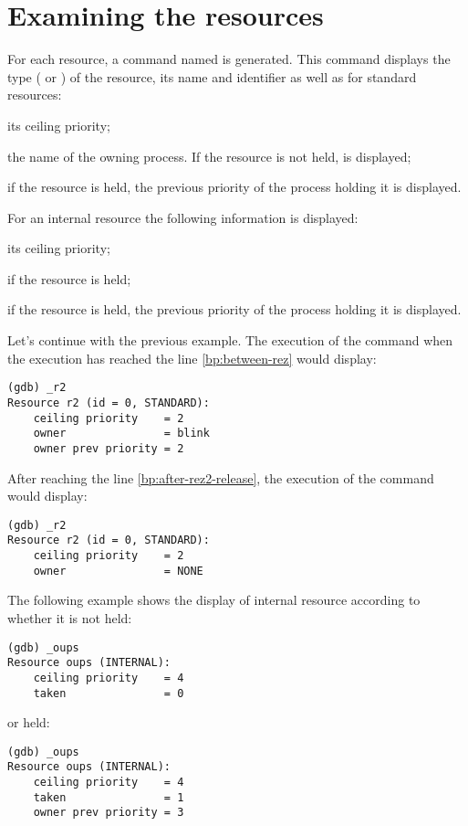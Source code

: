\section{Examining the resources}

For each resource, a command named  is generated. This command displays the type ( or ) of the resource, its name and identifier as well as for standard resources:

\begin{pitemize}
\item its ceiling priority;
\item the name of the owning process. If the resource is not held,  is displayed;
\item if the resource is held, the previous priority of the process holding it is displayed.
\end{pitemize}

For an internal resource the following information is displayed:

\begin{pitemize}
\item its ceiling priority;
\item if the resource is held;
\item if the resource is held, the previous priority of the process holding it is displayed.
\end{pitemize}

Let's continue with the previous example. The execution of the command  when the execution has reached the line \ref{bp:between-rez} would display:

\begin{lstlisting}
(gdb) _r2
Resource r2 (id = 0, STANDARD):
	ceiling priority    = 2
	owner               = blink
	owner prev priority = 2
\end{lstlisting} 

After reaching the line \ref{bp:after-rez2-release}, the execution of the command  would display:

\begin{lstlisting}
(gdb) _r2
Resource r2 (id = 0, STANDARD):
	ceiling priority    = 2
	owner               = NONE
\end{lstlisting} 

The following example shows the display of internal resource  according to whether it is not held:

\begin{lstlisting}
(gdb) _oups 
Resource oups (INTERNAL):
	ceiling priority    = 4
	taken               = 0
\end{lstlisting} 

or held:

\begin{lstlisting}
(gdb) _oups 
Resource oups (INTERNAL):
	ceiling priority    = 4
	taken               = 1
	owner prev priority = 3
\end{lstlisting} 
